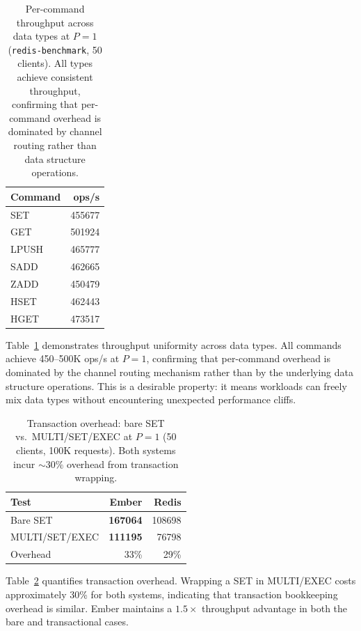 \documentclass[conference]{IEEEtran}
\begin{document}
\begin{table}[t]
\centering
\caption{Per-command throughput across data types at $P{=}1$
(\texttt{redis-benchmark}, 50 clients). All types achieve consistent
throughput, confirming that per-command overhead is dominated by
channel routing rather than data structure operations.}
\label{tab:datatypes}
\small
\begin{tabular}{@{}lr@{}}
\toprule
\textbf{Command} & \textbf{ops/s} \\
\midrule
SET     & \num{455677} \\
GET     & \num{501924} \\
LPUSH   & \num{465777} \\
SADD    & \num{462665} \\
ZADD    & \num{450479} \\
HSET    & \num{462443} \\
HGET    & \num{473517} \\
\bottomrule
\end{tabular}
\end{table}

Table~\ref{tab:datatypes} demonstrates throughput uniformity across
data types. All commands achieve 450--500K ops/s at $P{=}1$,
confirming that per-command overhead is dominated by the channel
routing mechanism rather than by the underlying data structure
operations. This is a desirable property: it means workloads can
freely mix data types without encountering unexpected performance
cliffs.

\begin{table}[t]
\centering
\caption{Transaction overhead: bare SET vs.\ MULTI/SET/EXEC at
$P{=}1$ (50 clients, 100K requests). Both systems incur
${\sim}30\%$ overhead from transaction wrapping.}
\label{tab:txn}
\small
\begin{tabular}{@{}lrr@{}}
\toprule
\textbf{Test} & \textbf{Ember} & \textbf{Redis} \\
\midrule
Bare SET          & \textbf{\num{167064}} & \num{108698} \\
MULTI/SET/EXEC    & \textbf{\num{111195}} & \num{76798} \\
Overhead          & 33\%                   & 29\% \\
\bottomrule
\end{tabular}
\end{table}

Table~\ref{tab:txn} quantifies transaction overhead. Wrapping a SET
in MULTI/EXEC costs approximately 30\% for both systems, indicating
that transaction bookkeeping overhead is similar. Ember maintains a
$1.5\times$ throughput advantage in both the bare and transactional
cases.
\end{document}
